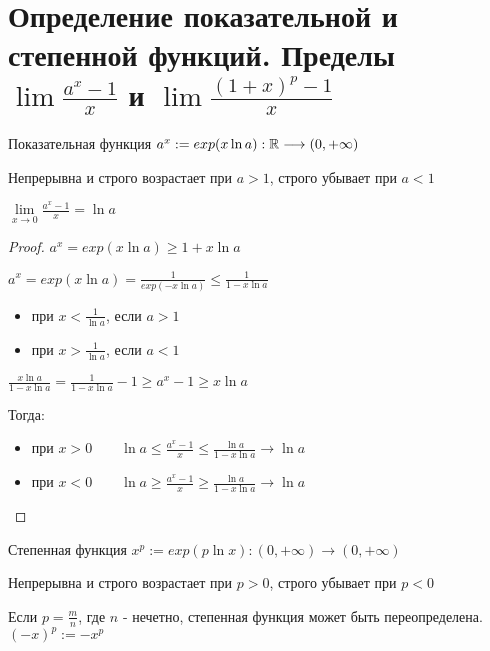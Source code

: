 \section{Определение показательной и степенной функций. Пределы $\lim{\frac{a^x - 1}{x}}$ и $\lim{\frac{(1+x)^p - 1}{x}}$}
\begin{conj}
    Показательная функция \qquad $a^x := exp(x \ln{a}): \mathbb{R} \longrightarrow (0, +\infty)$
    
    Непрерывна и строго возрастает при $a > 1$, строго убывает при $a < 1$
\end{conj}

\begin{theorem-non}
    $\lim\limits_{x \rightarrow 0}{\frac{a^x - 1}{x}} = \ln{a}$

    \begin{proof}
        $a^x = exp(x \ln{a}) \geqslant 1 + x \ln{a}$

        $a^x = exp(x \ln{a}) = \frac{1}{exp(-x\ln{a})} \leqslant \frac{1}{1 - x \ln{a}}$
        \begin{itemize}
            \item[] при $x < \frac{1}{\ln{a}}$, если $a > 1$
            \item[] при $x > \frac{1}{\ln{a}}$, если $a < 1$ 
        \end{itemize}

        $\frac{x\ln{a}}{1 - x \ln{a}} = \frac{1}{1 - x \ln{a}} - 1 \geqslant a^x - 1 \geqslant x\ln{a}$

        Тогда:
        \begin{itemize}
            \item[] при $x > 0 \qquad \ln{a} \leqslant \frac{a^x - 1}{x} \leqslant \frac{\ln{a}}{1 - x \ln{a}} \longrightarrow \ln{a}$
            \item[] при $x < 0 \qquad \ln{a} \geqslant \frac{a^x - 1}{x} \geqslant \frac{\ln{a}}{1 - x \ln{a}} \longrightarrow \ln{a}$
        \end{itemize}
    \end{proof}
\end{theorem-non}

\begin{conj}
        Степенная функция $x^p := exp(p \ln{x}) : (0, +\infty) \longrightarrow (0, +\infty)$

        Непрерывна и строго возрастает при $p > 0$, строго убывает при $p < 0$

        Если $p = \frac{m}{n}$, где $n$ - нечетно, степенная функция может быть переопределена. $(-x)^p := -x^p$
\end{conj}

